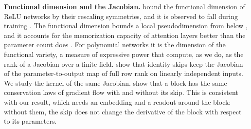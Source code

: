 \documentclass[10pt]{article}
\theoremstyle{definition}
\theoremstyle{remark}
\newcommand{\para}[1]{\smallskip\noindent\textbf{#1}\hspace{0.5em}}
\begin{document}
\para{Functional dimension and the Jacobian.} \citet{grigsby2022functional} bound the functional dimension of ReLU networks by their rescaling symmetries, and it is observed to fall during training \citep{bonapellissier2024geometry}. The functional dimension bounds a local pseudodimension from below \citep{grigsby2024persistent}, and it accounts for the memorization capacity of attention layers better than the parameter count does \citep{henry2026generic}. For polynomial networks it is the dimension of the functional variety, a measure of expressive power that \citet{kileel2019expressive} compute, as we do, as the rank of a Jacobian over a finite field. \citet{macdonald2023skip} show that identity skips keep the Jacobian of the parameter-to-output map of full row rank on linearly independent inputs. We study the kernel of the same Jacobian. \citet{marcotte2025resnets} show that a block has the same conservation laws of gradient flow with and without its skip. This is consistent with our result, which needs an embedding and a readout around the block: without them, the skip does not change the derivative of the block with respect to its parameters.
\end{document}
